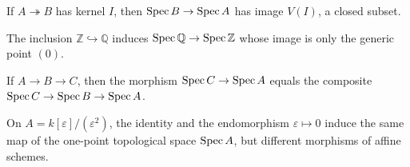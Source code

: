 \begin{example}
If $A\twoheadrightarrow B$ has kernel $I$, then $\operatorname{Spec} B\to\operatorname{Spec} A$ has image $V(I)$, a closed subset.
\end{example}

\begin{example}
The inclusion $\mathbb Z\hookrightarrow\mathbb Q$ induces $\operatorname{Spec}\mathbb Q\to\operatorname{Spec}\mathbb Z$ whose image is only the generic point $(0)$.
\end{example}

\begin{example}[Composition]
If $A\to B\to C$, then the morphism $\operatorname{Spec} C\to\operatorname{Spec} A$ equals the composite $\operatorname{Spec} C\to\operatorname{Spec} B\to\operatorname{Spec} A$.
\end{example}

\begin{example}
On $A=k[\varepsilon]/(\varepsilon^2)$, the identity and the endomorphism $\varepsilon\mapsto0$ induce the same map of the one-point topological space $\operatorname{Spec} A$, but different morphisms of affine schemes.
\end{example}


